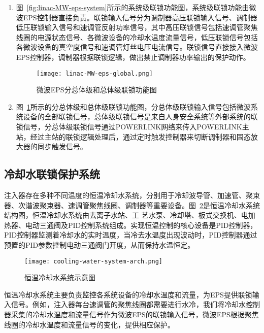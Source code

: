 \begin{enumerate}
  \item 图~\ref{fig:linac-MW-eps-system}所示的系统级联锁功能图，系统级联锁功能由微波EPS控制器直接负责。联锁输入信号分为调制器高压联锁输入信号、调制器低压联锁输入信号和速调管反射功率信号，其中高压联锁信号包括速调管聚焦线圈的电源状态信号、各微波设备的冷却水温度流量信号，低压联锁信号包括各微波设备的真空度信号和速调管灯丝电压电流信号。联锁信号直接接入微波EPS控制器，调制器根据联锁逻辑，做出禁止调制器功率输出的保护动作。

\begin{figure}[!htb]
	\centering
	\texttt{[image: linac-MW-eps-global.png]}
	\caption{微波EPS分总体级和总体级联锁功能图}
	\label{fig:linac-MW-eps-global}
\end{figure}

  \item 图~\ref{fig:linac-MW-eps-global}所示的分总体级和总体级联锁功能图，分总体级联锁输入信号包括微波系统设备的全部联锁信号，总体级联锁信号是来自人身安全系统等外部系统的联锁信号，分总体级联锁信号通过POWERLINK网络来传入POWERLINK主站，经过主站的联锁逻辑处理后，通过定时触发控制器来切断调制器和固态放大器的同步触发信号。

\end{enumerate}

\subsection{冷却水联锁保护系统}
注入器存在多种不同温度的恒温冷却水系统，分别用于冷却波导管、加速管、聚束器、次谐波聚束器、速调管聚焦线圈、调制器等重要设备。图~\ref{fig:cooling-water-system-arch}是恒温冷却水系统结构图，恒温冷却水系统由去离子水站、工 艺水泵、冷却塔、板式交换机、电加热器、电动三通阀及PID控制系统组成。实现恒温控制的核心设备是PID控制器，PID控制器监测着冷却水的实时温度，当冷去水温度出现波动时，PID控制器通过预置的PID参数控制电动三通阀门开度，从而保持水温恒定。

  \begin{figure}[!htb]
	\centering
	\texttt{[image: cooling-water-system-arch.png]}
	\caption{恒温冷却水系统示意图}
	\label{fig:cooling-water-system-arch}
\end{figure}

恒温冷却水系统主要负责监控各系统设备的冷却水温度和流量，为EPS提供联锁输入信号。例如，注入器每台速调管的聚焦线圈都需要进行水冷，我们将冷却水控制器采集的冷却水温度和流量信号作为微波EPS的联锁输入信号，微波EPS根据聚焦线圈的冷却水温度和流量信号的变化，提供相应保护。

